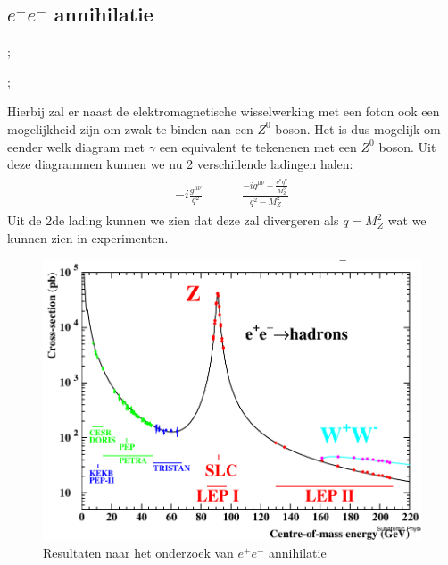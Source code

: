 \documentclass[../main.tex]{subfiles}
\begin{document}
\subsection{$e^+e^-$ annihilatie}%
\label{sub:_e_e_annihilatie}

\begin{minipage}[c]{0.5\textwidth}
    \begin{center}
        ;
    \end{center}
\end{minipage}\noindent
\begin{minipage}[c]{0.5\textwidth}
    \begin{center}
        ;
    \end{center}
\end{minipage}
Hierbij zal er naast de elektromagnetische wisselwerking met een foton ook een mogelijkheid zijn om zwak te binden aan een $Z^0$ boson. Het is dus mogelijk om eender welk diagram met $\gamma$ een equivalent te tekenenen met een $Z^0$ boson. Uit deze diagrammen kunnen we nu 2 verschillende ladingen halen:
\begin{equation}
    \begin{aligned}
        \label{eq:e+_e-_lading}
        \begin{matrix}
            -i\frac{g^{\mu\nu}}{q^2} &&&& \frac{-ig^{\mu\nu}- \frac{q^\mu q^\nu}{M_Z^2} }{q^2-M_Z^2}
        \end{matrix}
    \end{aligned}
\end{equation}
Uit de 2de lading kunnen we zien dat deze zal divergeren als $q=M_Z^2$ wat we kunnen zien in experimenten.

\begin{figure}[h]
    \centering
    \includegraphics[width=0.6\linewidth]{elektroweak_precision_tests/e+e-_annihilatie.png}
    \caption{Resultaten naar het onderzoek van $e^+e^-$ annihilatie}%
    \label{fig:elektroweak_precision_tests/e+e-_annihilatie}
\end{figure}
\end{document}
